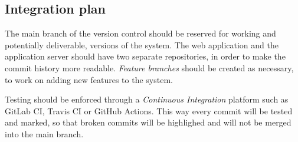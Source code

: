\subsection{Integration plan}
The main branch of the version control should be reserved for working and potentially deliverable, versions of the system. The web application and the application server should have two separate repositories, in order to make the commit history more readable. \emph{Feature branches} should be created as necessary, to work on adding new features to the system.

Testing should be enforced through a \emph{Continuous Integration} platform such as GitLab CI, Travis CI or GitHub Actions. This way every commit will be tested and marked, so that broken commits will be highlighed and will not be merged into the main branch.